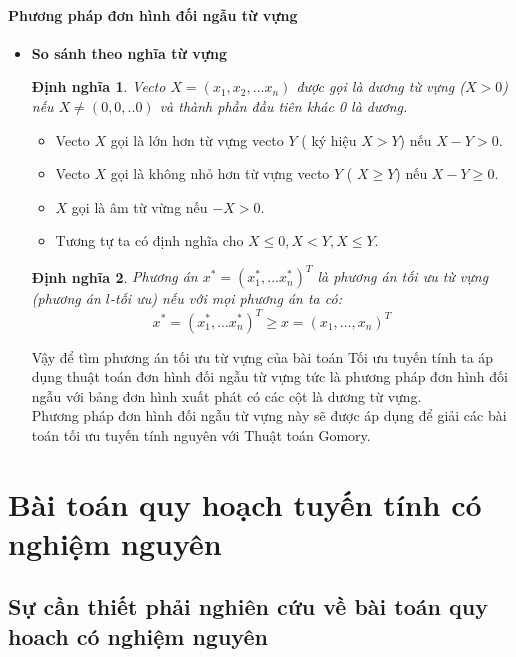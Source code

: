 \documentclass[12pt,a4paper]{report}
\newtheorem{dn}{Định nghĩa}
\begin{document}
\subsubsection{ Phương pháp đơn hình đối ngẫu từ vựng }
\begin{itemize}
    \item \textbf{So sánh theo nghĩa từ vựng}\\
    \begin{dn}
         Vecto $X=(x_1,x_2,...x_n)$ được gọi là dương từ vựng ($X >0$) nếu $X \ne (0,0,..0)$ và thành phần đầu tiên khác 0 là dương.\\ 
    \end{dn}
     \begin{itemize}
    \item Vecto $X$ gọi là lớn hơn từ vựng vecto $Y$ ( ký hiệu $X>Y$) nếu $X-Y>0$.\\ 
    \item Vecto $X$ gọi là không nhỏ hơn từ vựng vecto $Y$ ( $X\ge Y$) nếu $X-Y \ge 0$.\\
    \item $X$ gọi là âm từ vừng nếu $-X >0$.\\
    \item Tương tự ta có định nghĩa cho $X\le 0, X<Y, X\le Y$.\\
    
\end{itemize}
\begin{dn}
    Phương án $x^*=(x_1^*,...x_n^*)^T$ là phương án tối ưu từ vựng (phương án $l$-tối ưu) nếu với mọi phương án ta có:\\
    $$x^*=(x_1^*,...x_n^*)^T\ge x=(x_1,...,x_n)^T$$
\end{dn}
Vậy để tìm phương án tối ưu từ vựng của bài toán Tối ưu tuyến tính ta áp dụng thuật toán đơn hình đối ngẫu từ vựng tức là phương pháp đơn hình đối ngẫu với bảng đơn hình xuất phát có các cột là dương từ vựng.\\
Phương pháp đơn hình đối ngẫu từ vựng này sẽ được áp dụng để giải các bài toán tối ưu tuyến tính nguyên với Thuật toán Gomory.\\
\end{itemize}


\chapter{Bài toán quy hoạch tuyến tính có nghiệm nguyên}


\section{Sự cần thiết phải nghiên cứu về bài toán quy hoach có nghiệm nguyên}
\end{document}
